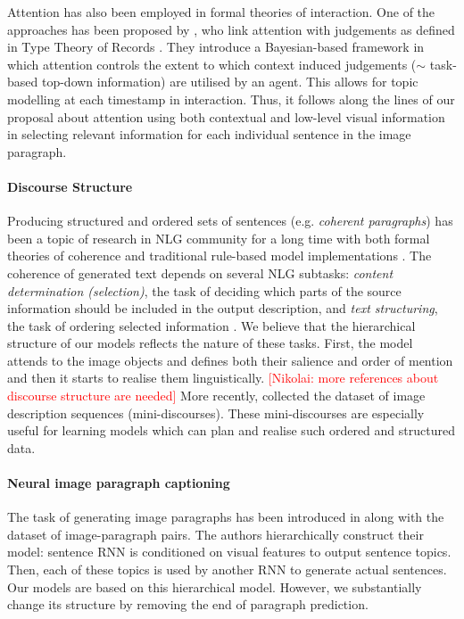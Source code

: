 \documentclass[11pt,a4paper]{article}
\newcommand{\kibitz}[2]{\ifnum\Comments=1\textcolor{#1}{#2}\fi}
\newcommand{\nikolai}[1]{\kibitz{red}   {[Nikolai: #1]}}
\begin{document}
Attention has also been employed in formal theories of interaction. One of the approaches has been proposed by , who link attention with judgements as defined in Type Theory of Records \cite{Cooper08typetheory}.
They introduce a Bayesian-based framework in which attention controls the extent to which context induced judgements ($\sim$ task-based top-down information) are utilised by an agent. This allows for topic modelling at each timestamp in interaction. Thus, it follows along the lines of our proposal about attention using both contextual and low-level visual information in selecting relevant information for each individual sentence in the image paragraph.

\fi

\paragraph{Discourse Structure}
Producing structured and ordered sets of sentences (e.g. \textit{coherent paragraphs}) has been a topic of research in NLG community for a long time with both formal theories of coherence \cite{grosz95,Barzilay2008} and traditional rule-based model implementations \cite{Reiter00buildingnatural}.
The coherence of generated text depends on several NLG subtasks: \textit{content determination (selection)}, the task of deciding which parts of the source information should be included in the output description, and \textit{text structuring}, the task of ordering selected information \cite{Gatt2017}.
We believe that the hierarchical structure of our models reflects the nature of these tasks. First, the model attends to the image objects and defines both their salience and order of mention and then it starts to realise them linguistically.
\nikolai{more references about discourse structure are needed}
More recently,  collected the dataset of image description sequences (mini-discourses).
These mini-discourses are especially useful for learning models which can plan and realise such ordered and structured data.

\paragraph{Neural image paragraph captioning}
The task of generating image paragraphs has been introduced in  along with the dataset of image-paragraph pairs.
The authors hierarchically construct their model: sentence RNN is conditioned on visual features to output sentence topics.
Then, each of these topics is used by another RNN to generate actual sentences.
Our models are based on this hierarchical model.
However, we substantially change its structure by removing the end of paragraph prediction.
\end{document}
